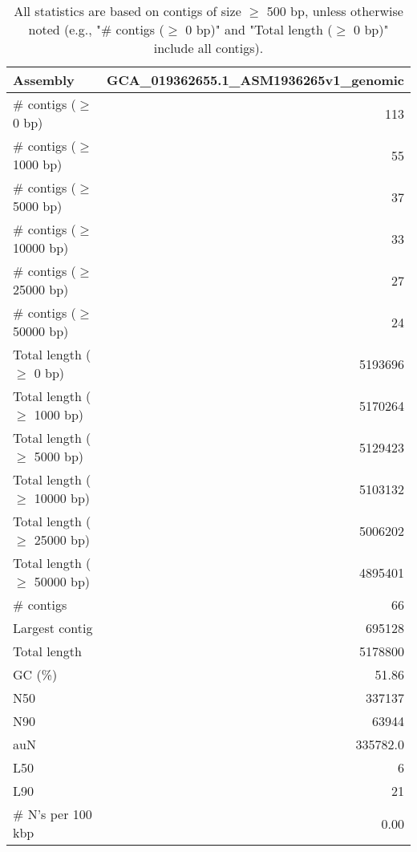 \documentclass[12pt,a4paper]{article}
\begin{document}
\begin{table}[ht]
\begin{center}
\caption{All statistics are based on contigs of size $\geq$ 500 bp, unless otherwise noted (e.g., "\# contigs ($\geq$ 0 bp)" and "Total length ($\geq$ 0 bp)" include all contigs).}
\begin{tabular}{|l*{1}{|r}|}
\hline
Assembly & GCA\_019362655.1\_ASM1936265v1\_genomic \\ \hline
\# contigs ($\geq$ 0 bp) & 113 \\ \hline
\# contigs ($\geq$ 1000 bp) & 55 \\ \hline
\# contigs ($\geq$ 5000 bp) & 37 \\ \hline
\# contigs ($\geq$ 10000 bp) & 33 \\ \hline
\# contigs ($\geq$ 25000 bp) & 27 \\ \hline
\# contigs ($\geq$ 50000 bp) & 24 \\ \hline
Total length ($\geq$ 0 bp) & 5193696 \\ \hline
Total length ($\geq$ 1000 bp) & 5170264 \\ \hline
Total length ($\geq$ 5000 bp) & 5129423 \\ \hline
Total length ($\geq$ 10000 bp) & 5103132 \\ \hline
Total length ($\geq$ 25000 bp) & 5006202 \\ \hline
Total length ($\geq$ 50000 bp) & 4895401 \\ \hline
\# contigs & 66 \\ \hline
Largest contig & 695128 \\ \hline
Total length & 5178800 \\ \hline
GC (\%) & 51.86 \\ \hline
N50 & 337137 \\ \hline
N90 & 63944 \\ \hline
auN & 335782.0 \\ \hline
L50 & 6 \\ \hline
L90 & 21 \\ \hline
\# N's per 100 kbp & 0.00 \\ \hline
\end{tabular}
\end{center}
\end{table}
\end{document}
